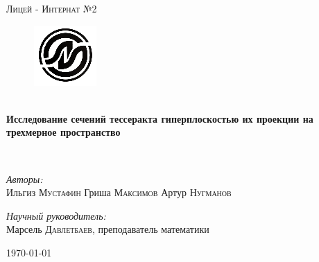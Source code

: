 \begin{titlepage}
\begin{center}
\textsc{\LARGE Лицей - Интернат №2}\\[1.5cm]

\begin{figure}
	\center
	\includegraphics[scale=0.8]{./li.png}
	\clearpage
\end{figure}


\selectfont
\HRule \\[0.4cm]
{ \huge \bfseries Исследование сечений тессеракта гиперплоскостью их проекции на трехмерное пространство\\[0.4cm] }

\HRule \\[1.5cm]

\noindent

\begin{minipage}{0.4\textwidth}
\begin{flushleft} \large
\emph{Авторы:}\\
Ильгиз \textsc{Мустафин} \newline
Гриша \textsc{Максимов} \newline %
Артур \textsc{Нугманов} 
\end{flushleft}

\end{minipage}%
\begin{minipage}{0.4\textwidth}
\begin{flushright} \large
\emph{Научный руководитель:} \\
Марсель \textsc{Давлетбаев}, преподаватель математики 
\end{flushright}
\end{minipage}

\vfill

{\large \today}

\end{center}
\end{titlepage}
